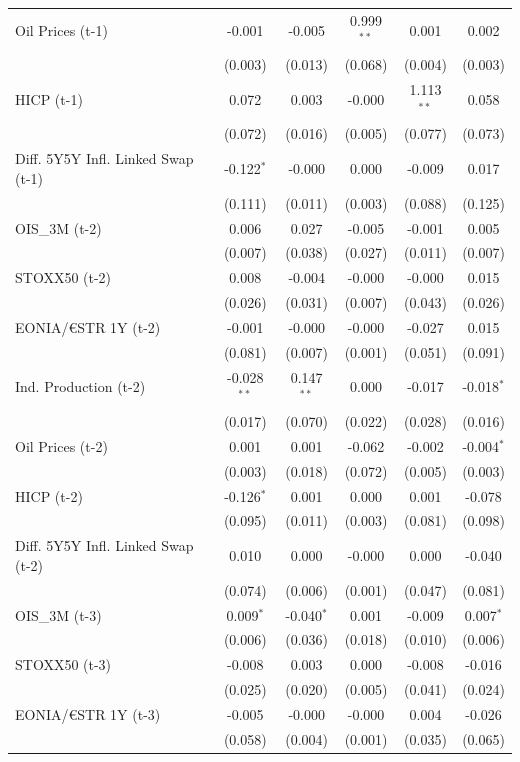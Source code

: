 \begin{longtable}[t]{lccccc}
Oil Prices (t-1) & -0.001 & -0.005 & 0.999$^{**}$ & 0.001 & 0.002\\
 & (0.003) & (0.013) & (0.068) & (0.004) & (0.003)\\
HICP (t-1) & 0.072 & 0.003 & -0.000 & 1.113$^{**}$ & 0.058\\
 & (0.072) & (0.016) & (0.005) & (0.077) & (0.073)\\
Diff. 5Y5Y Infl. Linked Swap (t-1) & -0.122$^{*}$ & -0.000 & 0.000 & -0.009 & 0.017\\
 & (0.111) & (0.011) & (0.003) & (0.088) & (0.125)\\
OIS\_3M (t-2) & 0.006 & 0.027 & -0.005 & -0.001 & 0.005\\
 & (0.007) & (0.038) & (0.027) & (0.011) & (0.007)\\
STOXX50 (t-2) & 0.008 & -0.004 & -0.000 & -0.000 & 0.015\\
 & (0.026) & (0.031) & (0.007) & (0.043) & (0.026)\\
EONIA/€STR 1Y (t-2) & -0.001 & -0.000 & -0.000 & -0.027 & 0.015\\
 & (0.081) & (0.007) & (0.001) & (0.051) & (0.091)\\
Ind. Production (t-2) & -0.028$^{**}$ & 0.147$^{**}$ & 0.000 & -0.017 & -0.018$^{*}$\\
 & (0.017) & (0.070) & (0.022) & (0.028) & (0.016)\\
Oil Prices (t-2) & 0.001 & 0.001 & -0.062 & -0.002 & -0.004$^{*}$\\
 & (0.003) & (0.018) & (0.072) & (0.005) & (0.003)\\
HICP (t-2) & -0.126$^{*}$ & 0.001 & 0.000 & 0.001 & -0.078\\
 & (0.095) & (0.011) & (0.003) & (0.081) & (0.098)\\
Diff. 5Y5Y Infl. Linked Swap (t-2) & 0.010 & 0.000 & -0.000 & 0.000 & -0.040\\
 & (0.074) & (0.006) & (0.001) & (0.047) & (0.081)\\
OIS\_3M (t-3) & 0.009$^{*}$ & -0.040$^{*}$ & 0.001 & -0.009 & 0.007$^{*}$\\
 & (0.006) & (0.036) & (0.018) & (0.010) & (0.006)\\
STOXX50 (t-3) & -0.008 & 0.003 & 0.000 & -0.008 & -0.016\\
 & (0.025) & (0.020) & (0.005) & (0.041) & (0.024)\\
EONIA/€STR 1Y (t-3) & -0.005 & -0.000 & -0.000 & 0.004 & -0.026\\
 & (0.058) & (0.004) & (0.001) & (0.035) & (0.065)\\

\end{longtable}
